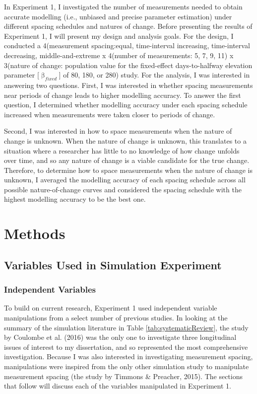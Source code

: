 \documentclass[
12pt, %
twoside,
english]{guelphthesis}
\theoremstyle{definition}
\theoremstyle{definition}
\theoremstyle{definition}
\theoremstyle{definition}
\theoremstyle{remark}
\begin{document}
In Experiment 1, I investigated the number of measurements needed to obtain accurate modelling (i.e., unbiased and precise parameter estimation) under different spacing schedules and natures of change. Before presenting the results of Experiment 1, I will present my design and analysis goals. For the design, I conducted a 4(measurement spacing:equal, time-interval increasing, time-interval decreasing, middle-and-extreme x 4(number of measurements: 5, 7, 9, 11) x 3(nature of change: population value for the fixed-effect days-to-halfway elevation parameter {[}\(\upbeta_{fixed}\){]} of 80, 180, or 280) study. For the analysis, I was interested in answering two questions. First, I was interested in whether spacing measurements near periods of change leads to higher modelling accuracy. To answer the first question, I determined whether modelling accuracy under each spacing schedule increased when measurements were taken closer to periods of change.

Second, I was interested in how to space measurements when the nature of change is unknown. When the nature of change is unknown, this translates to a situation where a researcher has little to no knowledge of how change unfolds over time, and so any nature of change is a viable candidate for the true change. Therefore, to determine how to space measurements when the nature of change is unknown, I averaged the modelling accuracy of each spacing schedule across all possible nature-of-change curves and considered the spacing schedule with the highest modelling accuracy to be the best one.

\hypertarget{methods}{%
\section{Methods}\label{methods}}

\hypertarget{variables-used-in-simulation-experiment}{%
\subsection{Variables Used in Simulation Experiment}\label{variables-used-in-simulation-experiment}}

\hypertarget{independent-variables}{%
\subsubsection{Independent Variables}\label{independent-variables}}

To build on current research, Experiment 1 used independent variable manipulations from a select number of previous studies. In looking at the summary of the simulation literature in Table \ref{tab:systematicReview}, the study by Coulombe et al. (2016) was the only one to investigate three longitudinal issues of interest to my dissertation, and so represented the most comprehensive investigation. Because I was also interested in investigating measurement spacing, manipulations were inspired from the only other simulation study to manipulate measurement spacing (the study by Timmons \& Preacher, 2015). The sections that follow will discuss each of the variables manipulated in Experiment 1.
\end{document}
